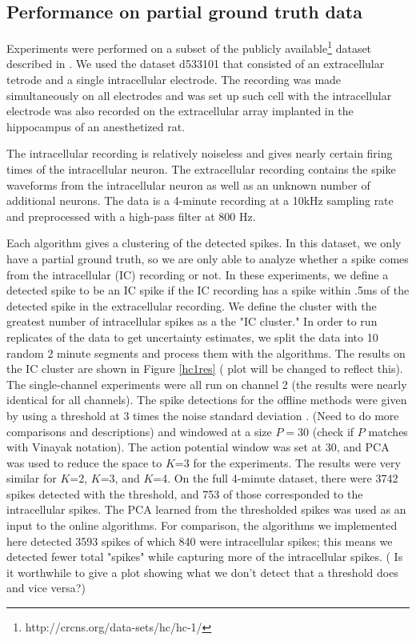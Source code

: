 \subsection{Performance on partial ground truth data}
Experiments were performed on a subset of the publicly available\footnote{http://crcns.org/data-sets/hc/hc-1/} dataset described in \cite{Henze2000}.  We used the dataset d533101 that consisted of an extracellular tetrode and a single intracellular electrode.  The recording was made simultaneously on all electrodes and was set up such cell with the intracellular electrode was also recorded on the extracellular array implanted in the hippocampus of an anesthetized rat.

The intracellular recording is relatively noiseless and gives nearly certain firing times of the intracellular neuron.  The extracellular recording contains the spike waveforms from the intracellular neuron as well as an unknown number of additional neurons.  The data is a 4-minute recording at a 10kHz sampling rate and preprocessed with a high-pass filter at 800 Hz.

Each algorithm gives a clustering of the detected spikes.  In this dataset, we only have a partial ground truth, so we are only able to analyze whether a spike comes from the intracellular (IC) recording or not.  In these experiments, we define a detected spike to be an IC spike if the IC recording has a spike within .5ms of the detected spike in the extracellular recording.  We define the cluster with the greatest number of intracellular spikes as a the "IC cluster."  In order to run replicates of the data to get uncertainty estimates, we split the data into 10 random 2 minute segments and process them with the algorithms.  The results on the IC cluster are shown in Figure \ref{hc1res} ({\color{red} plot will be changed to reflect this}).  The single-channel experiments were all run on channel 2 (the results were nearly identical for all channels).  The spike detections for the offline methods were given by using a threshold at 3 times the noise standard deviation \cite{Lewicki}. (Need to do more comparisons and descriptions) and windowed at a size $P=30$ (check if $P$ matches with Vinayak notation).  The action potential window was set at 30, and PCA was used to reduce the space to $K$=3 for the experiments.  The results were very similar for $K$=2, $K$=3, and $K$=4.   On the full 4-minute dataset, there were 3742 spikes detected with the threshold, and 753 of those corresponded to the intracellular spikes.  The PCA learned from the thresholded spikes was used as an input to the online algorithms.  For comparison, the algorithms we implemented here detected 3593 spikes of which 840 were intracellular spikes; this means we detected fewer total "spikes" while capturing more of the intracellular spikes. ({\color{red}  Is it worthwhile to give a plot showing what we don't detect that a threshold does and vice versa?})

